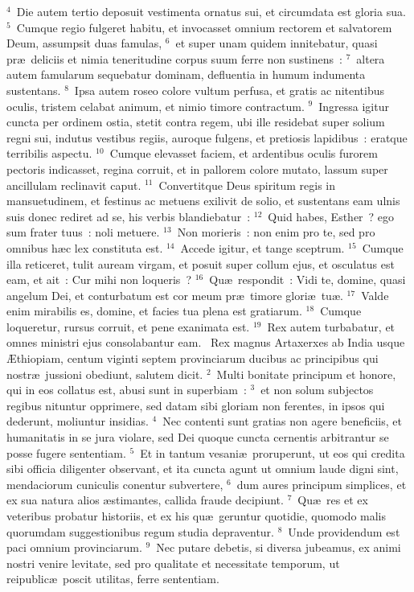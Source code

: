 ${}^{4}$~Die autem tertio deposuit vestimenta ornatus sui, et circumdata est gloria sua.
${}^{5}$~Cumque regio fulgeret habitu, et invocasset omnium rectorem et salvatorem Deum, assumpsit duas famulas,
${}^{6}$~et super unam quidem innitebatur, quasi pr\ae\ deliciis et nimia teneritudine corpus suum ferre non sustinens~:
${}^{7}$~altera autem famularum sequebatur dominam, defluentia in humum indumenta sustentans.
${}^{8}$~Ipsa autem roseo colore vultum perfusa, et gratis ac nitentibus oculis, tristem celabat animum, et nimio timore contractum.
${}^{9}$~Ingressa igitur cuncta per ordinem ostia, stetit contra regem, ubi ille residebat super solium regni sui, indutus vestibus regiis, auroque fulgens, et pretiosis lapidibus~: eratque terribilis aspectu.
${}^{10}$~Cumque elevasset faciem, et ardentibus oculis furorem pectoris indicasset, regina corruit, et in pallorem colore mutato, lassum super ancillulam reclinavit caput.
${}^{11}$~Convertitque Deus spiritum regis in mansuetudinem, et festinus ac metuens exilivit de solio, et sustentans eam ulnis suis donec rediret ad se, his verbis blandiebatur~:
${}^{12}$~Quid habes, Esther~? ego sum frater tuus~: noli metuere.
${}^{13}$~Non morieris~: non enim pro te, sed pro omnibus h\ae c lex constituta est.
${}^{14}$~Accede igitur, et tange sceptrum.
${}^{15}$~Cumque illa reticeret, tulit auream virgam, et posuit super collum ejus, et osculatus est eam, et ait~: Cur mihi non loqueris~?
${}^{16}$~Qu\ae\ respondit~: Vidi te, domine, quasi angelum Dei, et conturbatum est cor meum pr\ae\ timore glori\ae\ tu\ae .
${}^{17}$~Valde enim mirabilis es, domine, et facies tua plena est gratiarum.
${}^{18}$~Cumque loqueretur, rursus corruit, et pene exanimata est.
${}^{19}$~Rex autem turbabatur, et omnes ministri ejus consolabantur eam.
~\lettrine[lines=10,image=true,loversize=0.05,lraise=-0.03]{R}{}ex magnus Artaxerxes ab India usque \AE thiopiam, centum viginti septem provinciarum ducibus ac principibus qui nostr\ae\ jussioni obediunt, salutem dicit.
${}^{2}$~Multi bonitate principum et honore, qui in eos collatus est, abusi sunt in superbiam~:
${}^{3}$~et non solum subjectos regibus nituntur opprimere, sed datam sibi gloriam non ferentes, in ipsos qui dederunt, moliuntur insidias.
${}^{4}$~Nec contenti sunt gratias non agere beneficiis, et humanitatis in se jura violare, sed Dei quoque cuncta cernentis arbitrantur se posse fugere sententiam.
${}^{5}$~Et in tantum vesani\ae\ proruperunt, ut eos qui credita sibi officia diligenter observant, et ita cuncta agunt ut omnium laude digni sint, mendaciorum cuniculis conentur subvertere,
${}^{6}$~dum aures principum simplices, et ex sua natura alios \ae stimantes, callida fraude decipiunt.
${}^{7}$~Qu\ae\ res et ex veteribus probatur historiis, et ex his qu\ae\ geruntur quotidie, quomodo malis quorumdam suggestionibus regum studia depraventur.
${}^{8}$~Unde providendum est paci omnium provinciarum.
${}^{9}$~Nec putare debetis, si diversa jubeamus, ex animi nostri venire levitate, sed pro qualitate et necessitate temporum, ut reipublic\ae\ poscit utilitas, ferre sententiam.


